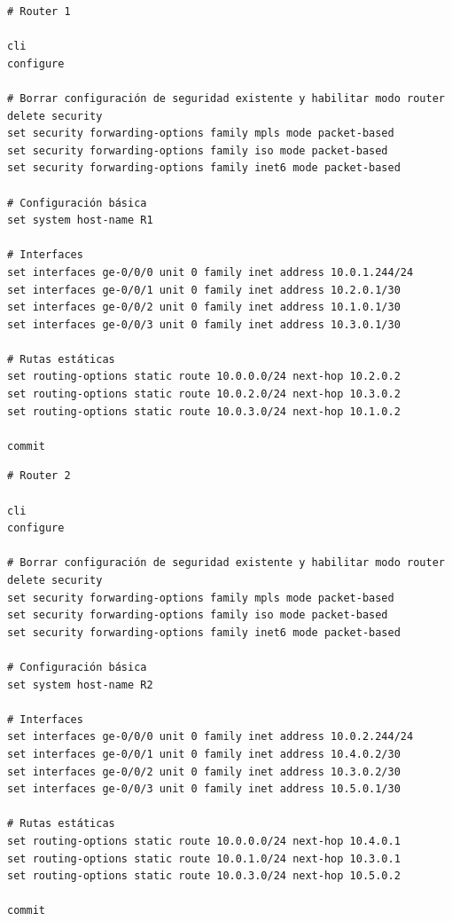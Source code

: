 \documentclass[%
    school=etsisi,%
    degree=61TI,%
]{upm-report}
\begin{document}
\begin{lstlisting}[breaklines]
# Router 1

cli
configure

# Borrar configuración de seguridad existente y habilitar modo router delete security
set security forwarding-options family mpls mode packet-based
set security forwarding-options family iso mode packet-based
set security forwarding-options family inet6 mode packet-based

# Configuración básica
set system host-name R1

# Interfaces
set interfaces ge-0/0/0 unit 0 family inet address 10.0.1.244/24
set interfaces ge-0/0/1 unit 0 family inet address 10.2.0.1/30
set interfaces ge-0/0/2 unit 0 family inet address 10.1.0.1/30
set interfaces ge-0/0/3 unit 0 family inet address 10.3.0.1/30

# Rutas estáticas
set routing-options static route 10.0.0.0/24 next-hop 10.2.0.2
set routing-options static route 10.0.2.0/24 next-hop 10.3.0.2
set routing-options static route 10.0.3.0/24 next-hop 10.1.0.2

commit
\end{lstlisting}

\begin{lstlisting}[breaklines]
# Router 2

cli
configure

# Borrar configuración de seguridad existente y habilitar modo router delete security
set security forwarding-options family mpls mode packet-based
set security forwarding-options family iso mode packet-based
set security forwarding-options family inet6 mode packet-based

# Configuración básica
set system host-name R2

# Interfaces
set interfaces ge-0/0/0 unit 0 family inet address 10.0.2.244/24
set interfaces ge-0/0/1 unit 0 family inet address 10.4.0.2/30
set interfaces ge-0/0/2 unit 0 family inet address 10.3.0.2/30
set interfaces ge-0/0/3 unit 0 family inet address 10.5.0.1/30

# Rutas estáticas
set routing-options static route 10.0.0.0/24 next-hop 10.4.0.1
set routing-options static route 10.0.1.0/24 next-hop 10.3.0.1
set routing-options static route 10.0.3.0/24 next-hop 10.5.0.2

commit 
\end{lstlisting}
\end{document}
